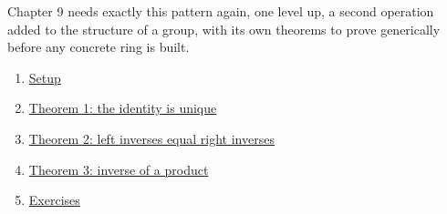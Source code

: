 Chapter 9 needs exactly this pattern again, one level up, a second operation added to the structure of a group, with its own theorems to prove generically before any concrete ring is built.


\begin{enumerate}
\def\labelenumi{\arabic{enumi}.}
\tightlist
\item
  \hyperref[sec:08-group-theorems:01-setup:1]{Setup}
\item
  \hyperref[sec:08-group-theorems:02-theorem-1:1]{Theorem 1: the identity is unique}
\item
  \hyperref[sec:08-group-theorems:03-theorem-2:1]{Theorem 2: left inverses equal right inverses}
\item
  \hyperref[sec:08-group-theorems:04-theorem-3:1]{Theorem 3: inverse of a product}
\item
  \hyperref[sec:08-group-theorems:05-exercises:1]{Exercises}
\end{enumerate}






